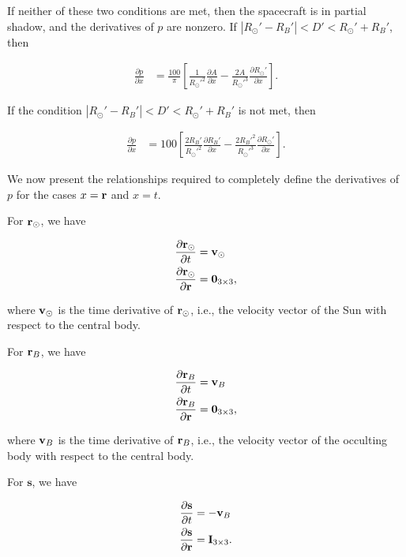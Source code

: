 \noindent If neither of these two conditions are met, then the spacecraft is in partial shadow, and the derivatives of $p$ are nonzero. If $| R_{\odot}' - R_B' | < D' < R_{\odot}' + R_B'$, then

\begin{align}
	\frac{\partial p}{\partial x} &= \frac{100}{\pi} \left[ \frac{1}{R_{\odot}'^2} \frac{\partial A}{\partial x} - \frac{2 A}{R_{\odot}'^3} \frac{\partial R_{\odot}'}{\partial x} \right].
\end{align}

\noindent If the condition $| R_{\odot}' - R_B' | < D' < R_{\odot}' + R_B'$ is not met, then

\begin{align}
	\frac{\partial p}{\partial x} &= 100 \left[ \frac{2 R_B'}{R_{\odot}'^2} \frac{\partial R_B'}{\partial x} - \frac{2 R_B'^2}{R_{\odot}'^3} \frac{\partial R_{\odot}'}{\partial x} \right].
\end{align}

We now present the relationships required to completely define the derivatives of $p$ for the cases $x = \mathbf{r}$ and $x = t$.

For $\mathbf{r}_{\odot}$, we have

\begin{align}
	\frac{\partial \mathbf{r}_{\odot}}{\partial t} &= \mathbf{v}_{\odot} \\
	\frac{\partial \mathbf{r}_{\odot}}{\partial \mathbf{r}} &= \mathbf{0}_{3 \times 3},
\end{align}

\noindent where $\mathbf{v}_{\odot}$ is the time derivative of $\mathbf{r}_{\odot}$, i.e., the velocity vector of the Sun with respect to the central body.

For $\mathbf{r}_{B}$, we have

\begin{align}
\frac{\partial \mathbf{r}_{B}}{\partial t} &= \mathbf{v}_{B} \\
\frac{\partial \mathbf{r}_{B}}{\partial \mathbf{r}} &= \mathbf{0}_{3 \times 3},
\end{align}

\noindent where $\mathbf{v}_{B}$ is the time derivative of $\mathbf{r}_{B}$, i.e., the velocity vector of the occulting body with respect to the central body.

For $\mathbf{s}$, we have

\begin{align}
\frac{\partial \mathbf{s}}{\partial t} &= - \mathbf{v}_B \\
\frac{\partial \mathbf{s}}{\partial \mathbf{r}} &= \mathbf{I}_{3 \times 3}.
\end{align}

